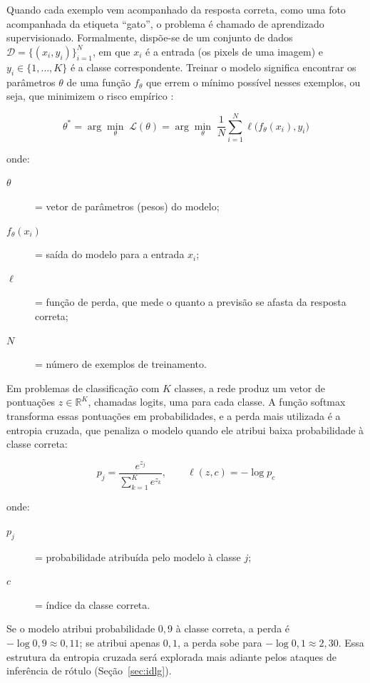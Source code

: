 Quando cada exemplo vem acompanhado da resposta correta, como uma foto acompanhada da etiqueta ``gato'', o problema é chamado de aprendizado supervisionado. Formalmente, dispõe-se de um conjunto de dados $\mathcal{D} = \{(x_i, y_i)\}_{i=1}^{N}$, em que $x_i$ é a entrada (os pixels de uma imagem) e $y_i \in \{1, \dots, K\}$ é a classe correspondente. Treinar o modelo significa encontrar os parâmetros $\theta$ de uma função $f_\theta$ que errem o mínimo possível nesses exemplos, ou seja, que minimizem o risco empírico \cite{Goodfellow2016}:

\begin{equation} \label{eq:risco}
\theta^{*} = \arg\min_{\theta} \; \mathcal{L}(\theta) = \arg\min_{\theta} \; \frac{1}{N} \sum_{i=1}^{N} \ell\big(f_\theta(x_i), y_i\big)
\end{equation}

\noindent onde:
\begin{description}
  \item[$\theta$] = vetor de parâmetros (pesos) do modelo;
  \item[$f_\theta(x_i)$] = saída do modelo para a entrada $x_i$;
  \item[$\ell$] = função de perda, que mede o quanto a previsão se afasta da resposta correta;
  \item[$N$] = número de exemplos de treinamento.
\end{description}

Em problemas de classificação com $K$ classes, a rede produz um vetor de pontuações $z \in \mathbb{R}^{K}$, chamadas logits, uma para cada classe. A função softmax transforma essas pontuações em probabilidades, e a perda mais utilizada é a entropia cruzada, que penaliza o modelo quando ele atribui baixa probabilidade à classe correta:

\begin{equation} \label{eq:softmax-ce}
p_j = \frac{e^{z_j}}{\sum_{k=1}^{K} e^{z_k}}, \qquad \ell(z, c) = -\log p_c
\end{equation}

\noindent onde:
\begin{description}
  \item[$p_j$] = probabilidade atribuída pelo modelo à classe $j$;
  \item[$c$] = índice da classe correta.
\end{description}

Se o modelo atribui probabilidade $0{,}9$ à classe correta, a perda é $-\log 0{,}9 \approx 0{,}11$; se atribui apenas $0{,}1$, a perda sobe para $-\log 0{,}1 \approx 2{,}30$. Essa estrutura da entropia cruzada será explorada mais adiante pelos ataques de inferência de rótulo (Seção~\ref{sec:idlg}).

